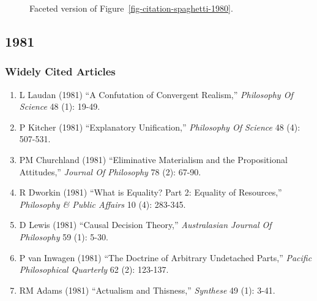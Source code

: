 \documentclass[
  10pt,
  letterpaper,
  DIV=11,
  numbers=noendperiod,
  twoside]{scrartcl}
\providecommand{\tightlist}{%
  \setlength{\itemsep}{0pt}\setlength{\parskip}{0pt}}\usepackage{longtable,booktabs,array}
\begin{document}
\begin{figure}


\caption{\label{fig-citation-facet-1980}Faceted version of
Figure~\ref{fig-citation-spaghetti-1980}.}

\end{figure}%

\newpage

\subsection{1981}\label{sec-s1981}

\subsubsection*{Widely Cited Articles}\label{widely-cited-articles-25}

\begin{enumerate}
\def\labelenumi{\arabic{enumi}.}
\tightlist
\item
  L Laudan (1981) ``A Confutation of Convergent Realism,''
  \emph{Philosophy Of Science} 48 (1): 19-49.
\item
  P Kitcher (1981) ``Explanatory Unification,'' \emph{Philosophy Of
  Science} 48 (4): 507-531.
\item
  PM Churchland (1981) ``Eliminative Materialism and the Propositional
  Attitudes,'' \emph{Journal Of Philosophy} 78 (2): 67-90.
\item
  R Dworkin (1981) ``What is Equality? Part 2: Equality of Resources,''
  \emph{Philosophy \& Public Affairs} 10 (4): 283-345.
\item
  D Lewis (1981) ``Causal Decision Theory,'' \emph{Australasian Journal
  Of Philosophy} 59 (1): 5-30.
\item
  P van Inwagen (1981) ``The Doctrine of Arbitrary Undetached Parts,''
  \emph{Pacific Philosophical Quarterly} 62 (2): 123-137.
\item
  RM Adams (1981) ``Actualism and Thisness,'' \emph{Synthese} 49 (1):
  3-41.
\end{enumerate}
\end{document}
